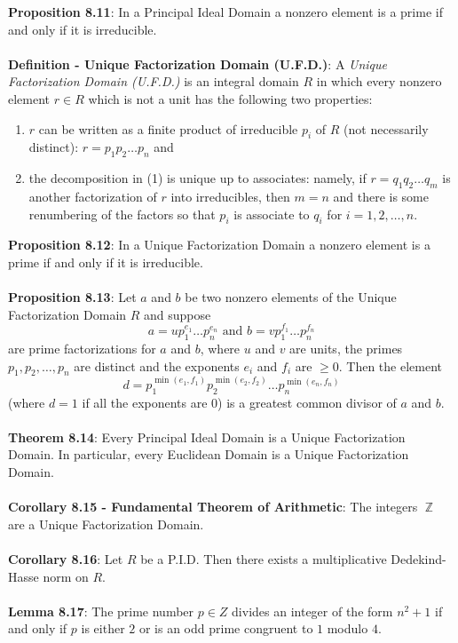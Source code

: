 \documentclass{article}
\DeclareMathOperator{\Z}{\mathbb{Z}}
\begin{document}
\textbf{Proposition 8.11}: In a Principal Ideal Domain a nonzero element is a prime if and only if it is irreducible. \\ \\
\textbf{Definition - Unique Factorization Domain (U.F.D.)}: A \textit{Unique Factorization Domain (U.F.D.)} is an integral domain $R$ in which every nonzero element $r \in R$ which is not a unit has the following two properties: \begin{enumerate}
    \item $r$ can be written as a finite product of irreducible $p_i$ of $R$ (not necessarily distinct): $r = p_1 p_2 \dots p_n$ and
    \item the decomposition in (1) is unique up to associates: namely, if $r = q_1 q_2 \dots q_m$ is another factorization of $r$ into irreducibles, then $m = n$ and there is some renumbering of the factors so that $p_i$ is associate to $q_i$ for $i = 1, 2, \dots, n$. 
\end{enumerate} $ $ \\
\textbf{Proposition 8.12}: In a Unique Factorization Domain a nonzero element is a prime if and only if it is irreducible. \\ \\
\textbf{Proposition 8.13}: Let $a$ and $b$ be two nonzero elements of the Unique Factorization Domain $R$ and suppose $$a = up_1^{e_1} \dots p_n^{e_n} \text{ and } b = vp_1^{f_1} \dots p_n^{f_n}$$ are prime factorizations for $a$ and $b$, where $u$ and $v$ are units, the primes $p_1, p_2, \dots, p_n$ are distinct and the exponents $e_i$ and $f_i$ are $\geq 0$. Then the element $$d = p_1^{\min(e_1, f_1)} p_2^{\min(e_2, f_2)} \dots p_n^{\min(e_n, f_n)}$$ (where $d = 1$ if all the exponents are $0$) is a greatest common divisor of $a$ and $b$. \\ \\
\textbf{Theorem 8.14}: Every Principal Ideal Domain is a Unique Factorization Domain. In particular, every Euclidean Domain is a Unique Factorization Domain. \\ \\
\textbf{Corollary 8.15 - Fundamental Theorem of Arithmetic}: The integers $\Z$ are a Unique Factorization Domain. \\ \\
\textbf{Corollary 8.16}: Let $R$ be a P.I.D. Then there exists a multiplicative Dedekind-Hasse norm on $R$. \\ \\
\textbf{Lemma 8.17}: The prime number $p \in Z$ divides an integer of the form $n^2 + 1$ if and only if $p$ is either $2$ or is an odd prime congruent to $1$ modulo $4$. \\ \\
\end{document}
